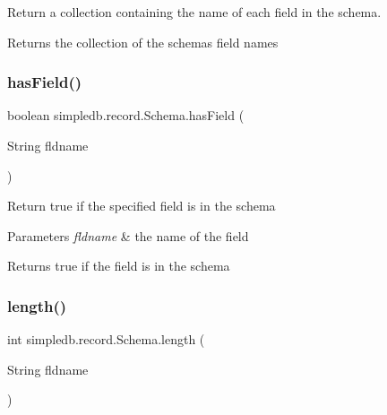 Return a collection containing the name of each field in the schema. \begin{DoxyReturn}{Returns}
the collection of the schema\textquotesingle{}s field names 
\end{DoxyReturn}
\mbox{\label{classsimpledb_1_1record_1_1Schema_a8f7aba3f1db8af14135c81802fe7a5e0}} 
\subsubsection{\texorpdfstring{has\+Field()}{hasField()}}
{\footnotesize\ttfamily boolean simpledb.\+record.\+Schema.\+has\+Field (\begin{DoxyParamCaption}\item[{String}]{fldname }\end{DoxyParamCaption})\hspace{0.3cm}{\ttfamily [inline]}}

Return true if the specified field is in the schema 
\begin{DoxyParams}{Parameters}
{\em fldname} & the name of the field \\
\hline
\end{DoxyParams}
\begin{DoxyReturn}{Returns}
true if the field is in the schema 
\end{DoxyReturn}
\mbox{\label{classsimpledb_1_1record_1_1Schema_a69e2645054df731e09efd43feee7345c}} 
\subsubsection{\texorpdfstring{length()}{length()}}
{\footnotesize\ttfamily int simpledb.\+record.\+Schema.\+length (\begin{DoxyParamCaption}\item[{String}]{fldname }\end{DoxyParamCaption})\hspace{0.3cm}{\ttfamily [inline]}}

